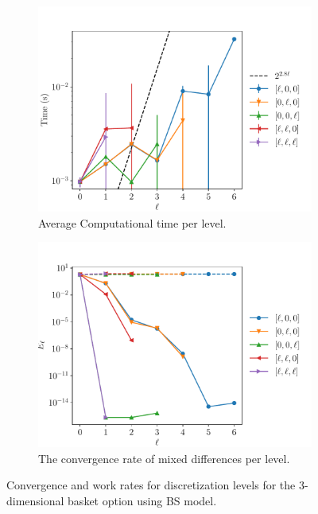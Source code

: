 \documentclass[11pt]{article}
\begin{document}
\begin{figure}[!h]
	\centering
	\begin{subfigure}{.4\textwidth}
		\centering
		\includegraphics[width=1\linewidth]{./figures/3D_basket/level_work.pdf}
		\caption{Average Computational time per level.}
		\label{fig:misc_3D_Basket_sub3}
	\end{subfigure}%
	\begin{subfigure}{.4\textwidth}
		\centering
		\includegraphics[width=1\linewidth]{./figures/3D_basket/levels_error_rate.pdf}
		\caption{The convergence rate of mixed differences per level.}
		\label{fig:misc_3D_Basket_sub4}
	\end{subfigure}%
	\caption{Convergence and work rates for discretization levels for the $3$-dimensional basket option using BS model.}
	\label{fig:misc_3D_Basket_2}
\end{figure}
\end{document}
